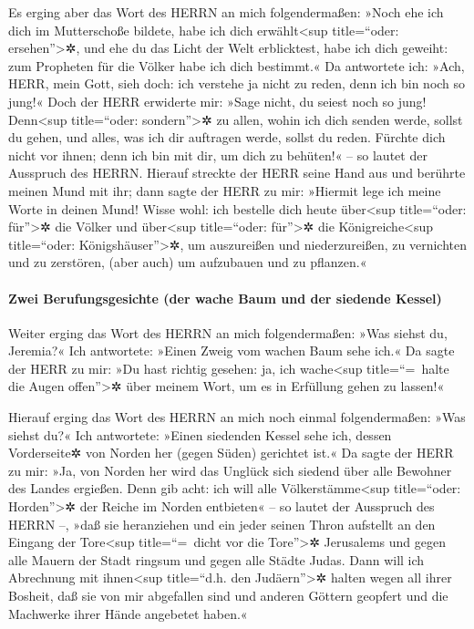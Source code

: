 Es erging aber das Wort des HERRN an mich folgendermaßen:
»Noch ehe ich dich im Mutterschoße bildete, habe ich dich
erwählt\textless sup title=``oder: ersehen''\textgreater✲, und ehe du
das Licht der Welt erblicktest, habe ich dich geweiht: zum Propheten für
die Völker habe ich dich bestimmt.« Da antwortete ich:
»Ach, HERR, mein Gott, sieh doch: ich verstehe ja nicht zu reden, denn
ich bin noch so jung!« Doch der HERR erwiderte mir: »Sage
nicht, du seiest noch so jung! Denn\textless sup title=``oder:
sondern''\textgreater✲ zu allen, wohin ich dich senden werde, sollst du
gehen, und alles, was ich dir auftragen werde, sollst du reden.
Fürchte dich nicht vor ihnen; denn ich bin mit dir, um
dich zu behüten!« -- so lautet der Ausspruch des HERRN.
Hierauf streckte der HERR seine Hand aus und berührte
meinen Mund mit ihr; dann sagte der HERR zu mir: »Hiermit lege ich meine
Worte in deinen Mund! Wisse wohl: ich bestelle dich heute
über\textless sup title=``oder: für''\textgreater✲ die Völker und
über\textless sup title=``oder: für''\textgreater✲ die
Königreiche\textless sup title=``oder: Königshäuser''\textgreater✲, um
auszureißen und niederzureißen, zu vernichten und zu zerstören, (aber
auch) um aufzubauen und zu pflanzen.«

\hypertarget{zwei-berufungsgesichte-der-wache-baum-und-der-siedende-kessel}{%
\paragraph{Zwei Berufungsgesichte (der wache Baum und der siedende
Kessel)}\label{zwei-berufungsgesichte-der-wache-baum-und-der-siedende-kessel}}

Weiter erging das Wort des HERRN an mich folgendermaßen:
»Was siehst du, Jeremia?« Ich antwortete: »Einen Zweig vom wachen Baum
sehe ich.« Da sagte der HERR zu mir: »Du hast richtig
gesehen: ja, ich wache\textless sup title=``=~halte die Augen
offen''\textgreater✲ über meinem Wort, um es in Erfüllung gehen zu
lassen!«

Hierauf erging das Wort des HERRN an mich noch einmal
folgendermaßen: »Was siehst du?« Ich antwortete: »Einen siedenden Kessel
sehe ich, dessen Vorderseite✲ von Norden her (gegen Süden) gerichtet
ist.« Da sagte der HERR zu mir: »Ja, von Norden her wird
das Unglück sich siedend über alle Bewohner des Landes ergießen.
Denn gib acht: ich will alle Völkerstämme\textless sup
title=``oder: Horden''\textgreater✲ der Reiche im Norden entbieten« --
so lautet der Ausspruch des HERRN --, »daß sie heranziehen und ein jeder
seinen Thron aufstellt an den Eingang der Tore\textless sup
title=``=~dicht vor die Tore''\textgreater✲ Jerusalems und gegen alle
Mauern der Stadt ringsum und gegen alle Städte Judas.
Dann will ich Abrechnung mit ihnen\textless sup
title=``d.h. den Judäern''\textgreater✲ halten wegen all ihrer Bosheit,
daß sie von mir abgefallen sind und anderen Göttern geopfert und die
Machwerke ihrer Hände angebetet haben.«

